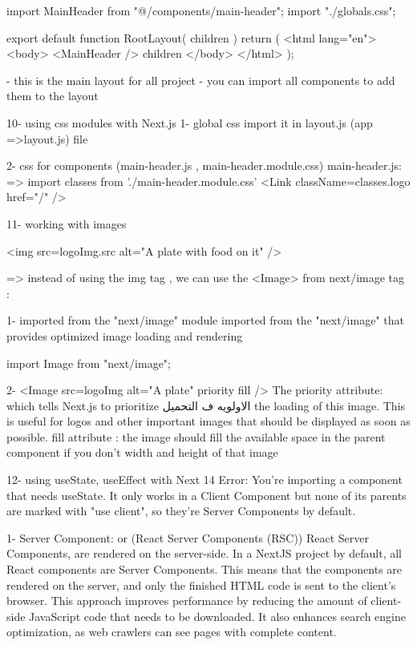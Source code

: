             import MainHeader from "@/components/main-header";
            import "./globals.css";


            export default function RootLayout({ children }) {
                        return (
                            <html lang="en">
                            <body>
                                <MainHeader />
                                {children}
                            </body>
                            </html>
                        );
                        }

          -  this is the main layout for all project 
          -  you can import all components to add them to the layout


10- using css modules with Next.js
    1- global css import it  in layout.js (app =>layout.js) file 

    2- css for components (main-header.js , main-header.module.css)
        main-header.js:
             => import classes from './main-header.module.css'
               <Link  className={classes.logo} href="/" />

11- working with images

            <img src={logoImg.src} alt="A plate with food on it" />
        
    => instead of using the img tag , we can use the <Image> from next/image tag :

            1-  imported from the "next/image" module  imported from the "next/image"
                that provides optimized image loading and rendering

                import Image from "next/image";

            2- <Image src={logoImg} alt="A plate" priority fill />
                The priority attribute: which tells Next.js to prioritize الاولويه ف التحميل the loading of this image.
                This is useful for logos and other important images that should be displayed as soon as possible.
                fill attribute : the image should fill the available space in the parent component if you don't width and height of that image


12- using useState, useEffect with Next 14 
    Error: You're importing a component that needs useState. It only works in a Client Component but none of its parents are marked with "use client", so they're Server Components by default.

    1- Server Component: or (React Server Components (RSC))
            React Server Components, are rendered on the server-side. In a NextJS project
            by default, all React components are Server Components.
            This means that the components are rendered on the server, and only the finished HTML code is sent to the client's browser. 
            This approach improves performance by reducing the amount of client-side JavaScript code that needs to be downloaded. 
            It also enhances search engine optimization, as web crawlers can see pages with complete content.

